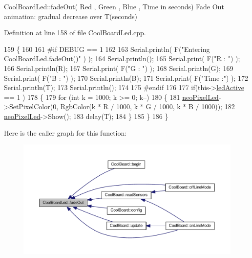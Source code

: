Cool\+Board\+Led\+::fade\+Out( Red , Green , Blue , Time in seconds) Fade Out animation\+: gradual decrease over T(seconds) 

Definition at line 158 of file Cool\+Board\+Led.\+cpp.


\begin{DoxyCode}
159 \{
160 
161 \textcolor{preprocessor}{#if DEBUG == 1 }
162 
163     Serial.println( F(\textcolor{stringliteral}{"Entering CoolBoardLed.fadeOut()"} ) );
164     Serial.println();
165     Serial.print( F(\textcolor{stringliteral}{"R : "}) );
166     Serial.println(R);
167     Serial.print( F(\textcolor{stringliteral}{"G : "}) );
168     Serial.println(G);
169     Serial.print( F(\textcolor{stringliteral}{"B : "}) );
170     Serial.println(B);
171     Serial.print( F(\textcolor{stringliteral}{"Time :"}) );
172     Serial.println(T);
173     Serial.println();
174 
175 \textcolor{preprocessor}{#endif  }
176 
177     \textcolor{keywordflow}{if}(this->\hyperlink{class_cool_board_led_aadd04d2ecf123247718d77f42fba7f08}{ledActive} == 1 )
178     \{
179         \textcolor{keywordflow}{for} (\textcolor{keywordtype}{int} k = 1000; k >= 0; k--) 
180         \{
181             \hyperlink{class_cool_board_led_ac2c13fa462a010cd9242bf297c013923}{neoPixelLed}->SetPixelColor(0, RgbColor(k * R / 1000, k * G / 1000, k * B / 1000));
182             \hyperlink{class_cool_board_led_ac2c13fa462a010cd9242bf297c013923}{neoPixelLed}->Show();
183             delay(T);
184         \}
185     \}
186 \}
\end{DoxyCode}
Here is the caller graph for this function\+:\nopagebreak
\begin{figure}[H]
\begin{center}
\leavevmode
\includegraphics[width=350pt]{de/dc0/class_cool_board_led_a93d545679237e8cc858324367149775c_icgraph}
\end{center}
\end{figure}
\mbox{\label{class_cool_board_led_a8ed3053a36f0ed4a131f43b5b17efb61}} 
